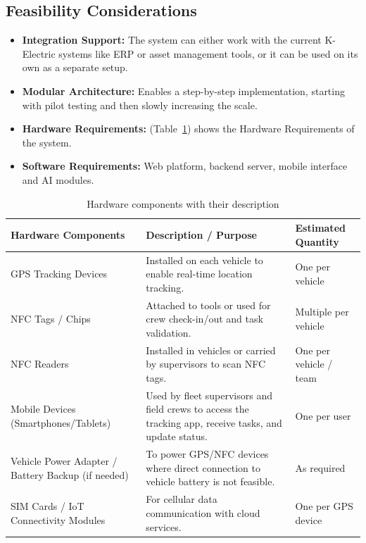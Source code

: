 \subsection{Feasibility Considerations}
\begin{itemize}
    \item \textbf{Integration Support:} The system can either work with the current K-Electric systems like ERP or asset management tools, or it can be used on its own as a separate setup.
    \item \textbf{Modular Architecture:} Enables a step-by-step implementation, starting with pilot testing and then slowly increasing the scale.
    \item \textbf{Hardware Requirements:} (Table~\ref{tab:1.1}) shows the Hardware Requirements of the system.
    \item \textbf{Software Requirements:} Web platform, backend server, mobile interface and AI modules.
\end{itemize}

\begin{table}[H]
    \centering
    \caption{Hardware components with their description}
    \label{tab:1.1}
    \begin{tabular}{>{\raggedright\arraybackslash}p{5cm}>{\raggedright\arraybackslash}p{6cm}>{\raggedright\arraybackslash}p{3cm}}
        \toprule
        \textbf{Hardware Components} & \textbf{Description / Purpose} & \textbf{Estimated Quantity} \\
        \midrule
        GPS Tracking Devices & Installed on each vehicle to enable real-time location tracking. & One per vehicle \\
        NFC Tags / Chips & Attached to tools or used for crew check-in/out and task validation. & Multiple per vehicle \\
        NFC Readers & Installed in vehicles or carried by supervisors to scan NFC tags. & One per vehicle / team \\
        Mobile Devices (Smartphones/Tablets) & Used by fleet supervisors and field crews to access the tracking app, receive tasks, and update status. & One per user \\
        Vehicle Power Adapter / Battery Backup (if needed) & To power GPS/NFC devices where direct connection to vehicle battery is not feasible. & As required \\
        SIM Cards / IoT Connectivity Modules & For cellular data communication with cloud services. & One per GPS device \\
        \bottomrule
    \end{tabular}
\end{table}


